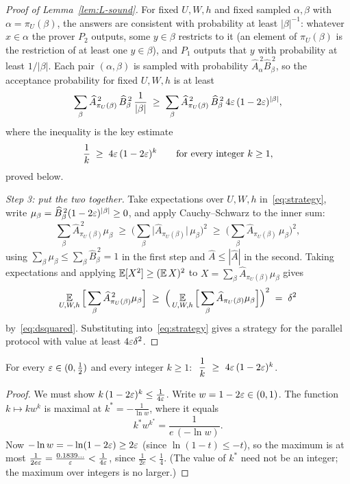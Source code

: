 \begin{proof}[Proof of Lemma~\ref{lem:L-sound}]
For fixed $U,W,h$ and fixed sampled $\alpha,\beta$ with $\alpha=\pi_U(\beta)$, the answers are consistent with probability at least $|\beta|^{-1}$: whatever $x\in\alpha$ the prover $P_2$ outputs, some $y\in\beta$ restricts to it (an element of $\pi_U(\beta)$ is the restriction of at least one $y\in\beta$), and $P_1$ outputs that $y$ with probability at least $1/|\beta|$.
Each pair $(\alpha,\beta)$ is sampled with probability $\widehat A_\alpha^{\,2}\widehat B_\beta^{\,2}$, so the acceptance probability for fixed $U,W,h$ is at least
\begin{equation}\label{eq:strategy}
  \sum_{\beta}\widehat A_{\pi_U(\beta)}^{\,2}\,\widehat B_\beta^{\,2}\,\frac{1}{|\beta|}\;\ge\;\sum_\beta\widehat A_{\pi_U(\beta)}^{\,2}\,\widehat B_\beta^{\,2}\,4\varepsilon\,(1-2\varepsilon)^{|\beta|},
\end{equation}
where the inequality is the key estimate
\begin{equation}\label{eq:key-ineq}
  \frac{1}{k}\;\ge\;4\varepsilon\,(1-2\varepsilon)^{k}\qquad\text{for every integer }k\ge1,
\end{equation}
proved below.

\emph{Step 3: put the two together.}  Take expectations over $U,W,h$ in~\eqref{eq:strategy}, write $\mu_\beta=\widehat B_\beta^{\,2}(1-2\varepsilon)^{|\beta|}\ge0$, and apply Cauchy--Schwarz to the inner sum:
\[
  \sum_\beta \widehat A_{\pi_U(\beta)}^{\,2}\mu_\beta\;\ge\;\Big(\sum_\beta\big|\widehat A_{\pi_U(\beta)}\big|\,\mu_\beta\Big)^2 \;\ge\;\Big(\sum_\beta\widehat A_{\pi_U(\beta)}\,\mu_\beta\Big)^2,
\]
using $\sum_\beta\mu_\beta\le\sum_\beta\widehat B_\beta^{\,2}=1$ in the first step and $\widehat A\le|\widehat A|$ in the second.
Taking expectations and applying $\operatorname*{\mathbb{E}}[X^2]\ge(\operatorname*{\mathbb{E}} X)^2$ to $X=\sum_\beta\widehat A_{\pi_U(\beta)}\mu_\beta$ gives
\[
  \operatorname*{\mathbb{E}}_{U,W,h}\Big[\sum_\beta\widehat A_{\pi_U(\beta)}^{\,2}\mu_\beta\Big]\;\ge\;\Big(\operatorname*{\mathbb{E}}_{U,W,h}\Big[\sum_\beta\widehat A_{\pi_U(\beta)}\mu_\beta\Big]\Big)^2\;=\;\delta^2
\]
by~\eqref{eq:dsquared}.  Substituting into~\eqref{eq:strategy} gives a strategy for the parallel protocol with value at least $4\varepsilon\delta^2$.
\end{proof}

\begin{lemma}\label{lem:key-ineq}
For every $\varepsilon\in(0,\tfrac12)$ and every integer $k\ge1$: $\ \dfrac{1}{k}\ \ge\ 4\eps\,(1-2\eps)^{k}$.
\end{lemma}
\begin{proof}
We must show $k\,(1-2\varepsilon)^k\le\frac1{4\varepsilon}$.  Write $w=1-2\varepsilon\in(0,1)$.  The function $k\mapsto kw^k$ is maximal at $k^\ast=-\frac1{\ln w}$, where it equals
\[
  k^\ast w^{k^\ast}=\frac{1}{e\,(-\ln w)} .
\]
Now $-\ln w=-\ln(1-2\varepsilon)\ge 2\varepsilon$ (since $\ln(1-t)\le-t$), so the maximum is at most $\frac{1}{2e\varepsilon}=\frac{0.1839\ldots}{\varepsilon}<\frac{1}{4\varepsilon}$, since $\frac1{2e}<\frac14$.
(The value of $k^\ast$ need not be an integer; the maximum over integers is no larger.)
\end{proof}


